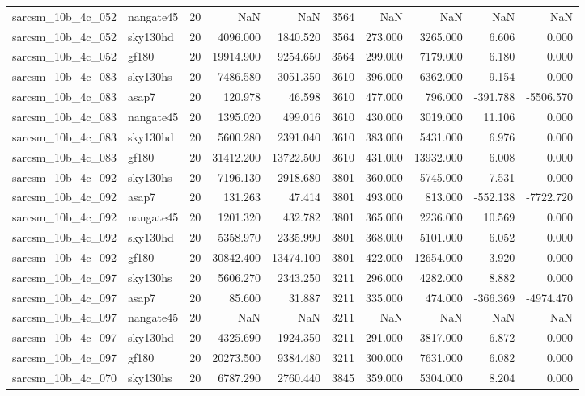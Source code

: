 \begin{tabular}{llrrrrrrrr}
sarcsm\_10b\_4c\_052 & nangate45 & 20 & NaN & NaN & 3564 & NaN & NaN & NaN & NaN \\
sarcsm\_10b\_4c\_052 & sky130hd & 20 & 4096.000 & 1840.520 & 3564 & 273.000 & 3265.000 & 6.606 & 0.000 \\
sarcsm\_10b\_4c\_052 & gf180 & 20 & 19914.900 & 9254.650 & 3564 & 299.000 & 7179.000 & 6.180 & 0.000 \\
sarcsm\_10b\_4c\_083 & sky130hs & 20 & 7486.580 & 3051.350 & 3610 & 396.000 & 6362.000 & 9.154 & 0.000 \\
sarcsm\_10b\_4c\_083 & asap7 & 20 & 120.978 & 46.598 & 3610 & 477.000 & 796.000 & -391.788 & -5506.570 \\
sarcsm\_10b\_4c\_083 & nangate45 & 20 & 1395.020 & 499.016 & 3610 & 430.000 & 3019.000 & 11.106 & 0.000 \\
sarcsm\_10b\_4c\_083 & sky130hd & 20 & 5600.280 & 2391.040 & 3610 & 383.000 & 5431.000 & 6.976 & 0.000 \\
sarcsm\_10b\_4c\_083 & gf180 & 20 & 31412.200 & 13722.500 & 3610 & 431.000 & 13932.000 & 6.008 & 0.000 \\
sarcsm\_10b\_4c\_092 & sky130hs & 20 & 7196.130 & 2918.680 & 3801 & 360.000 & 5745.000 & 7.531 & 0.000 \\
sarcsm\_10b\_4c\_092 & asap7 & 20 & 131.263 & 47.414 & 3801 & 493.000 & 813.000 & -552.138 & -7722.720 \\
sarcsm\_10b\_4c\_092 & nangate45 & 20 & 1201.320 & 432.782 & 3801 & 365.000 & 2236.000 & 10.569 & 0.000 \\
sarcsm\_10b\_4c\_092 & sky130hd & 20 & 5358.970 & 2335.990 & 3801 & 368.000 & 5101.000 & 6.052 & 0.000 \\
sarcsm\_10b\_4c\_092 & gf180 & 20 & 30842.400 & 13474.100 & 3801 & 422.000 & 12654.000 & 3.920 & 0.000 \\
sarcsm\_10b\_4c\_097 & sky130hs & 20 & 5606.270 & 2343.250 & 3211 & 296.000 & 4282.000 & 8.882 & 0.000 \\
sarcsm\_10b\_4c\_097 & asap7 & 20 & 85.600 & 31.887 & 3211 & 335.000 & 474.000 & -366.369 & -4974.470 \\
sarcsm\_10b\_4c\_097 & nangate45 & 20 & NaN & NaN & 3211 & NaN & NaN & NaN & NaN \\
sarcsm\_10b\_4c\_097 & sky130hd & 20 & 4325.690 & 1924.350 & 3211 & 291.000 & 3817.000 & 6.872 & 0.000 \\
sarcsm\_10b\_4c\_097 & gf180 & 20 & 20273.500 & 9384.480 & 3211 & 300.000 & 7631.000 & 6.082 & 0.000 \\
sarcsm\_10b\_4c\_070 & sky130hs & 20 & 6787.290 & 2760.440 & 3845 & 359.000 & 5304.000 & 8.204 & 0.000 \\

\end{tabular}
